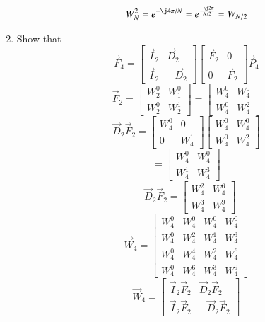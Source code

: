 \documentclass[journal,12pt,twocolumn]{IEEEtran}
\renewcommand\thesection{\arabic{section}}
\begin{document}
\begin{enumerate}[label=\thesection.\arabic*]
\solution
\[W_{N}^{2} = e^{-\j4\pi/N} = e^{\frac{-\j2\pi}{N/2}} = W_{N/2}\]
    \item Show that 
\begin{equation}
	\vec{F}_{4}=
\begin{bmatrix}
	\vec{I}_{2} & \vec{D}_{2} \\
\vec{I}_{2} & -\vec{D}_{2}
\end{bmatrix}
\begin{bmatrix}
\vec{F}_{2} & 0 \\
0 & \vec{F}_{2}
\end{bmatrix}
\vec{P}_{4}
\end{equation}
\solution
\[
\vec{F}_{2} = 
\begin{bmatrix}
    W^0_2 & W^0_1 \\
    W^0_2 & W^1_2
\end{bmatrix} = 
\begin{bmatrix}
     W^0_4 & W^0_4 \\
    W^0_4 & W^2_4
\end{bmatrix}
\]
\[
\vec{D}_{2}\vec{F}_{2} =
\begin{bmatrix}
    W^0_4 & 0 \\
    0 & W^1_4
\end{bmatrix}
\begin{bmatrix}
     W^0_4 & W^0_4 \\
    W^0_4 & W^2_4
\end{bmatrix}
\]
\[
=
\begin{bmatrix}
    W^0_4 & W^0_4 \\
    W^1_4 & W^3_4
\end{bmatrix}
\]
\[
-\vec{D}_{2}\vec{F}_{2} =
\begin{bmatrix}
    W^2_4 & W^6_4 \\
    W^3_4 & W^9_4
\end{bmatrix}
\]
\[
\vec{W}_4 =
\begin{bmatrix}
    W^0_4 & W^0_4 & W^0_4 & W^0_4 \\
    W^0_4 & W^2_4 & W^1_4 & W^3_4 \\
    W^0_4 & W^4_4 & W^2_4 & W^6_4 \\
    W^0_4 & W^6_4 & W^3_4 & W^9_4
\end{bmatrix}
\]
\[
\vec{W}_4 = 
\begin{bmatrix}
    \vec{I}_2\vec{F}_2 & \vec{D}_2\vec{F}_2 \\
    \vec{I}_2\vec{F}_2 & -\vec{D}_2\vec{F}_2

\end{bmatrix}\]
\end{enumerate}
\end{document}

